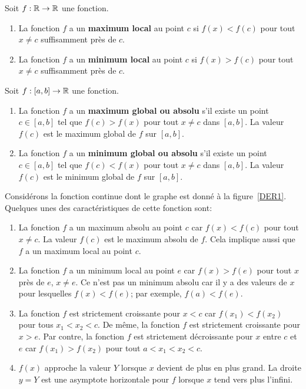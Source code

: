 {\begin{defn}
Soit $f:\mathbb{R} \rightarrow \mathbb{R}$ une fonction.
\begin{enumerate}
\item La fonction $f$ a un {\bfseries maximum local}
 au point $c$ si $f(x) < f(c)$ pour tout
$x \neq c$ suffisamment près de $c$.
\item La fonction $f$ a un {\bfseries minimum local}
 au point $c$ si $f(x) > f(c)$ pour tout
$x \neq c$ suffisamment près de $c$.
\end{enumerate}
\end{defn}

\begin{defn}
Soit $f:[a,b] \rightarrow \mathbb{R}$ une fonction.
\begin{enumerate}
\item La fonction $f$ a un {\bfseries maximum global ou absolu}
 
s'il existe un point $c \in [a,b]$ tel que $f(c) > f(x)$
pour tout $x\neq c$ dans $[a,b]$.  La valeur $f(c)$ est le maximum
global de $f$ sur $[a,b]$.
\item La fonction $f$ a un {\bfseries minimum global ou absolu}
 
s'il existe un point $c \in [a,b]$ tel que $f(c) < f(x)$
pour tout $x\neq c$ dans $[a,b]$.  La valeur $f(c)$ est le minimum
global de $f$ sur $[a,b]$.
\end{enumerate}
\label{maxminabs}
\end{defn}

\begin{egg}
Considérons la fonction continue dont le graphe est donné à la
figure~\ref{DER1}.  Quelques unes des caractéristiques de cette
fonction sont:
\begin{enumerate}
\item La fonction $f$ a un maximum absolu au point $c$ car $f(x)<f(c)$
pour tout $x\neq c$.  La valeur $f(c)$ est le maximum absolu de $f$.
Cela implique aussi que $f$ a un maximum local au point $c$.
\item La fonction $f$ a un minimum local au point $e$ car $f(x)>f(e)$
pour tout $x$ près de $e$, $x\neq e$.  Ce n'est pas un minimum absolu
car il y a des valeurs de $x$ pour lesquelles $f(x) < f(e)$; par
exemple, $f(a) < f(e)$.
\item La fonction $f$ est strictement croissante pour $x<c$ car
$f(x_1) < f(x_2)$ pour tous $x_1 < x_2 < c$.  De même, la fonction $f$
est strictement croissante pour $x>e$.  Par contre, la fonction $f$
est strictement décroissante pour $x$ entre $c$ et $e$ car
$f(x_1) > f(x_2)$ pour tout $a < x_1 < x_2 < c$.
\item $f(x)$ approche la valeur $Y$ lorsque $x$ devient de
plus en plus grand.  La droite $y=Y$ est une asymptote horizontale
pour $f$ lorsque $x$ tend vers plus l'infini.
\end{enumerate}
\label{caractF}
\end{egg}

}
